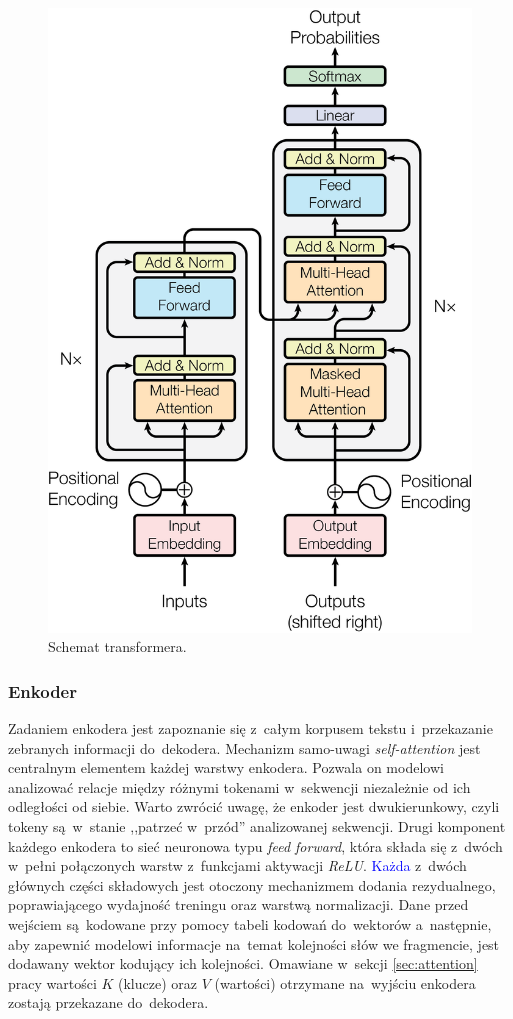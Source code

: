 \documentclass[data-science]{agh-wi} %
\begin{document}
\begin{figure}[!ht]
    \begin{center}
        \includegraphics[width=0.7\linewidth]{img/transformer1}
    \end{center}
    \caption{Schemat transformera.}
    \label{fig:transformer1}
\end{figure}

\subsubsection*{Enkoder}
Zadaniem enkodera jest zapoznanie się z~całym korpusem tekstu i~przekazanie zebranych informacji do~dekodera. Mechanizm samo-uwagi \textit{self-attention} jest centralnym elementem każdej warstwy enkodera. Pozwala on modelowi analizować relacje między różnymi tokenami w~sekwencji niezależnie od ich odległości od siebie. Warto zwrócić uwagę, że enkoder jest dwukierunkowy, czyli tokeny są~w~stanie ,,patrzeć w~przód'' analizowanej sekwencji. Drugi komponent każdego enkodera to sieć neuronowa typu \textit{feed forward}, która składa się z~dwóch w~pełni połączonych warstw z~funkcjami aktywacji \textit{ReLU}. \textcolor{blue}{Każda} z~dwóch głównych części składowych jest otoczony mechanizmem dodania rezydualnego, poprawiającego wydajność treningu oraz warstwą normalizacji. Dane przed wejściem są~kodowane przy pomocy tabeli kodowań do~wektorów a~następnie, aby zapewnić modelowi informacje na~temat kolejności słów we fragmencie, jest dodawany wektor kodujący ich kolejności. Omawiane w~sekcji \ref*{sec:attention} pracy wartości $K$ (klucze) oraz $V$ (wartości) otrzymane na~wyjściu enkodera zostają przekazane do~dekodera.
\end{document}
